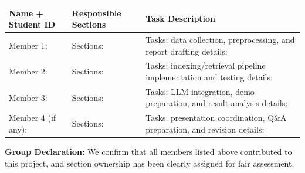 \documentclass[11pt,a4paper]{article}
\begin{document}
\vspace{1em}
\begin{longtable}{|p{}|p{}|p{}|}
\hline
\textbf{Name + Student ID} & \textbf{Responsible Sections} & \textbf{Task Description} \\
\hline
Member 1: \newline \underline{\hspace{6cm}} &
Sections: \newline \underline{\hspace{8cm}} &
Tasks: data collection, preprocessing, and report drafting details: \newline \underline{\hspace{8cm}} \\
\hline
Member 2: \newline \underline{\hspace{6cm}} &
Sections: \newline \underline{\hspace{8cm}} &
Tasks: indexing/retrieval pipeline implementation and testing details: \newline \underline{\hspace{8cm}} \\
\hline
Member 3: \newline \underline{\hspace{6cm}} &
Sections: \newline \underline{\hspace{8cm}} &
Tasks: LLM integration, demo preparation, and result analysis details: \newline \underline{\hspace{8cm}} \\
\hline
Member 4 (if any): \newline \underline{\hspace{6cm}} &
Sections: \newline \underline{\hspace{8cm}} &
Tasks: presentation coordination, Q\&A preparation, and revision details: \newline \underline{\hspace{8cm}} \\
\hline
\end{longtable}

\vfill
\textbf{Group Declaration:}
We confirm that all members listed above contributed to this project, and section ownership has been clearly assigned for fair assessment.
\end{document}
